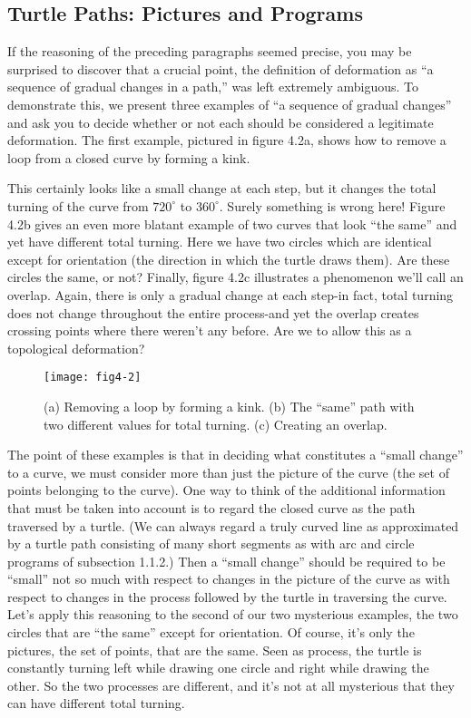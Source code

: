 \documentclass{book}
\begin{document}
\subsection{Turtle Paths: Pictures and Programs}

If the reasoning of the preceding paragraphs seemed precise, you may be
surprised to discover that a crucial point, the definition of deformation as
``a sequence of gradual changes in a path,'' was left extremely ambiguous.
To demonstrate this, we present three examples of ``a sequence of gradual
changes'' and ask you to decide whether or not each should be considered
a legitimate deformation. The first example, pictured in figure 4.2a,
shows how to remove a loop from a closed curve by forming a kink.

This certainly looks like a small change at each step, but it changes the
total turning of the curve from $720^{\circ}$ to $360^{\circ}$. Surely something is wrong
here! Figure 4.2b gives an even more blatant example of two curves
that look ``the same'' and yet have different total turning. Here we
have two circles which are identical except for orientation (the direction
in which the turtle draws them). Are these circles the same, or not?
Finally, figure 4.2c illustrates a phenomenon we'll call an overlap. Again,
there is only a gradual change at each step-in fact, total turning does
not change throughout the entire process-and yet the overlap creates
crossing points where there weren't any before. Are we to allow this as
a topological deformation?

\begin{figure}
\begin{center}
\texttt{[image: fig4-2]}
\caption{(a) Removing a loop by forming a kink. (b) The ``same'' path with two different values for total turning. (c) Creating an overlap.}
\end{center}
\end{figure}

The point of these examples is that in deciding what constitutes a
``small change'' to a curve, we must consider more than just the picture
of the curve (the set of points belonging to the curve). One way to
think of the additional information that must be taken into account is to
regard the closed curve as the path traversed by a turtle. (We can always
regard a truly curved line as approximated by a turtle path consisting
of many short segments as with arc and circle programs of subsection
1.1.2.) Then a ``small change'' should be required to be ``small'' not so
much with respect to changes in the picture of the curve as with respect
to changes in the process followed by the turtle in traversing the curve.
Let's apply this reasoning to the second of our two mysterious examples, the two circles that are ``the same'' except for orientation. Of
course, it's only the pictures, the set of points, that are the same. Seen
as process, the turtle is constantly turning left while drawing one circle
and right while drawing the other. So the two processes are different,
and it's not at all mysterious that they can have different total turning.
\end{document}
